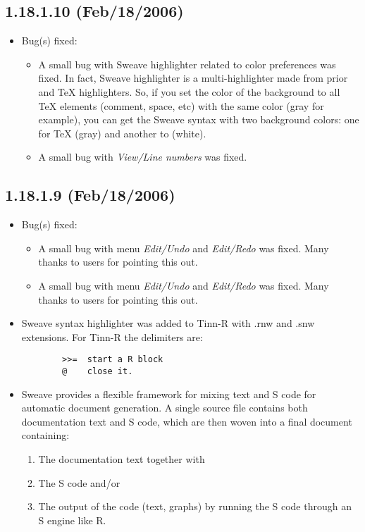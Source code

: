 \subsection{1.18.1.10 (Feb/18/2006)}

\begin{itemize}
  \item Bug(s) fixed:
    \begin{itemize}
      \item A small bug with Sweave highlighter related to color preferences
        was fixed. In fact, Sweave highlighter is a multi-highlighter made
        from prior \RR{} and TeX highlighters. So, if you set the color
        of the background to all TeX elements (comment, space, etc) with
        the same color (gray for example), you can get the Sweave syntax with
        two background colors: one for TeX (gray) and another to \RR{} (white).
      \item A small bug with \textit{View/Line numbers} was fixed.
    \end{itemize}
\end{itemize}


\subsection{1.18.1.9 (Feb/18/2006)}

\begin{itemize}
  \item Bug(s) fixed:
    \begin{itemize}
      \item A small bug with menu \textit{Edit/Undo} and \textit{Edit/Redo}
        was fixed. Many thanks to users for pointing this out.
      \item A small bug with menu \textit{Edit/Undo} and \textit{Edit/Redo}
        was fixed. Many thanks to users for pointing this out.
    \end{itemize}
  \item Sweave syntax highlighter was added to Tinn-R with .rnw and .snw
    extensions. For Tinn-R the delimiters are:

    \begin{footnotesize}
      \begin{verbatim}
        >>=  start a R block
        @    close it.
      \end{verbatim}
    \end{footnotesize}

  \item Sweave provides a flexible framework for mixing text and S code
    for automatic document generation. A single source file contains both
    documentation text and S code, which are then woven into a final
    document containing:
    \begin{enumerate}
      \item The documentation text together with
      \item The S code and/or
      \item The output of the code (text, graphs) by running the S code
        through an S engine like R.
    \end{enumerate}
\end{itemize}

